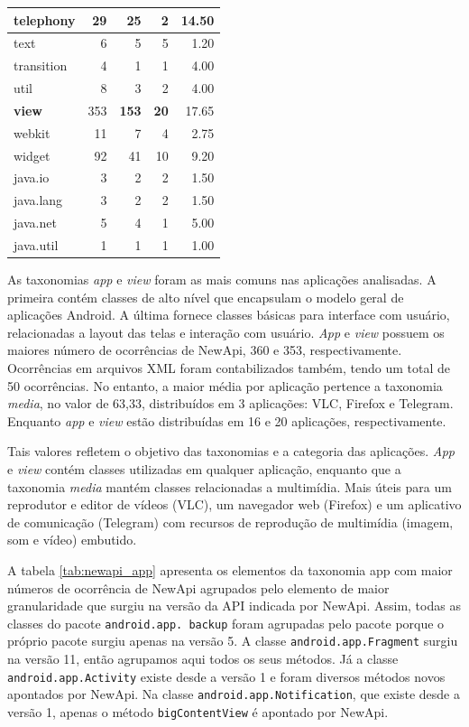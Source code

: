 \begin{table}[!htb]
\begin{tabular}{| l | r | r | r | r |}
 	telephony       & 29 			& 25 			&   2 			& 14.50   \\ \hline
 	text        	& 6 			& 5 			&   5 			& 1.20   \\ \hline
 	transition 	 	& 4 			& 1 			&   1 			& 4.00   \\ \hline
 	util       	 	& 8				& 3 			&   2 			& 4.00   \\ \hline
 	\textbf{view}  	& 353 			& \textbf{153} 	&  \textbf{20} 	& 17.65   \\ \hline
 	webkit        	& 11 			& 7 			&  4 			& 2.75   \\ \hline
 	widget 			& 92			& 41 			&  10 			& 9.20   \\ \hline
 	java.io 		& 3				& 2 			&  2 			& 1.50   \\ \hline
 	java.lang 		& 3				& 2 			&  2 			& 1.50   \\ \hline
 	java.net 		& 5				& 4 			&  1 			& 5.00   \\ \hline
 	java.util 		& 1				& 1 			&  1 			& 1.00   \\ \hline
  \end{tabular}
  \label{tab:elementos_nova_api}
\end{table}

As taxonomias \textit{app} e \textit{view} foram as mais comuns nas aplicações analisadas.
A primeira contém classes de alto nível que encapsulam o modelo geral de aplicações Android.
A última fornece classes básicas para interface com usuário, relacionadas a layout das telas
e interação com usuário. \textit{App} e \textit{view} possuem os maiores número de ocorrências
de NewApi, 360 e 353, respectivamente. Ocorrências em arquivos XML foram contabilizados também,
tendo um total de 50 ocorrências. No entanto, a maior média por aplicação pertence a taxonomia
\textit{media}, no valor de 63,33, distribuídos em 3 aplicações:  VLC, Firefox e Telegram.
Enquanto \textit{app} e \textit{view} estão distribuídas em 16 e 20 aplicações, respectivamente.

Tais valores refletem o objetivo das taxonomias e a categoria das aplicações.
\textit{App} e \textit{view} contém classes utilizadas em qualquer aplicação, enquanto que a
taxonomia \textit{media} mantém classes relacionadas a multimídia. Mais úteis para um reprodutor
e editor de vídeos (VLC), um navegador web (Firefox) e um aplicativo de comunicação (Telegram)
com recursos de reprodução de multimídia (imagem, som e vídeo) embutido.

A tabela \ref{tab:newapi_app} apresenta os elementos da taxonomia app com maior
números de ocorrência de NewApi agrupados pelo elemento de maior granularidade
que surgiu na versão da API indicada por NewApi. Assim, todas as classes do pacote
\texttt{android.app. backup} foram agrupadas pelo pacote porque o próprio pacote
surgiu apenas na versão 5. A classe \texttt{android.app.Fragment} surgiu na versão
11, então agrupamos aqui todos os seus métodos. Já a classe \texttt{android.app.Activity}
existe desde a versão 1 e foram diversos métodos novos apontados por NewApi. Na
classe \texttt{android.app.Notification}, que existe desde a versão 1, apenas o
método \texttt{bigContentView} é apontado por NewApi.

